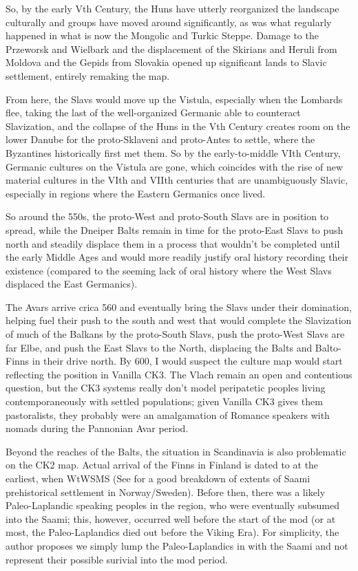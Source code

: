 \documentclass{article}
\begin{document}
	So, by the early Vth Century, the Huns have utterly reorganized the landscape culturally and groups have moved around significantly, as was what regularly happened in what is now the Mongolic and Turkic Steppe.
	Damage to the Przeworsk and Wielbark and the displacement of the Skirians and Heruli from Moldova and the Gepids from Slovakia opened up significant lands to Slavic settlement, entirely remaking the map.
	
	From here, the Slavs would move up the Vistula, especially when the Lombards flee, taking the last of the well-organized Germanic able to counteract Slavization, and the collapse of the Huns in the Vth Century creates room on the lower Danube for the proto-Sklaveni and proto-Antes to settle, where the Byzantines historically first met them.
	So by the early-to-middle VIth Century, Germanic cultures on the Vistula are gone, which coincides with the rise of new material cultures in the VIth and VIIth centuries that are unambiguously Slavic, especially in regions where the Eastern Germanics once lived.
	
	So around the 550s, the proto-West and proto-South Slavs are in position to spread, while the Dneiper Balts remain in time for the proto-East Slavs to push north and steadily displace them in a process that wouldn’t be completed until the early Middle Ages \cite{EmergenceOfRussia} and would more readily justify oral history recording their existence (compared to the seeming lack of oral history where the West Slavs displaced the East Germanics).
	
	The Avars arrive crica 560 and eventually bring the Slavs under their domination, helping fuel their push to the south and west that would complete the Slavization of much of the Balkans by the proto-South Slavs, push the proto-West Slavs are far Elbe, and push the East Slavs to the North, displacing the Balts and Balto-Finns in their drive north.
	By 600, I would suspect the culture map would start reflecting the position in Vanilla CK3.
	The Vlach remain an open and contentious question, but the CK3 systems really don't model peripatetic peoples living contemporaneously with settled populations; given Vanilla CK3 gives them pastoralists, they probably were an amalgamation of Romance speakers with nomads during the Pannonian Avar period.
	
	Beyond the reaches of the Balts, the situation in Scandinavia is also problematic on the CK2 map. Actual arrival of the Finns in Finland is dated to at the earliest, when WtWSMS \cite{LaplandSaami} (See \cite{SaamiMap} for a good breakdown of extents of Saami prehistorical settlement in Norway/Sweden).
	Before then, there was a likely Paleo-Laplandic speaking peoples in the region, who were eventually subsumed into the Saami; this, however, occurred well before the start of the mod (or at most, the Paleo-Laplandics died out before the Viking Era). 
	For simplicity, the author proposes we simply lump the Paleo-Laplandics in with the Saami and not represent their possible surivial into the mod period.
	
\end{document}
